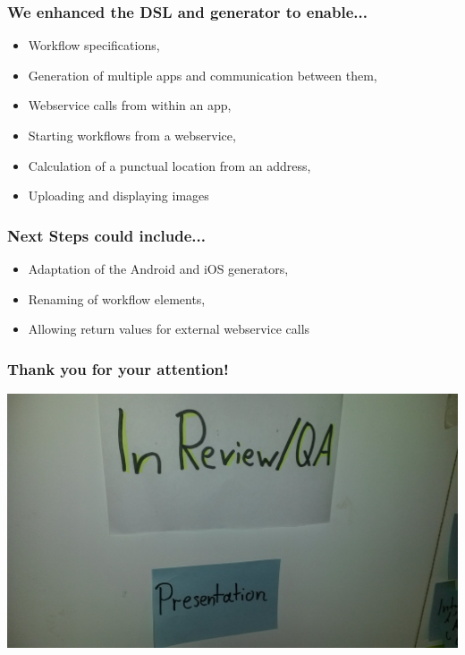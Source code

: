 \begin{frame}[t]
    \frametitle{We enhanced the DSL and generator to enable...}
    
    \begin{itemize}
    	\item Workflow specifications,
    	\item Generation of multiple apps and communication between them,
    	\item Webservice calls from within an app,
    	\item Starting workflows from a webservice,
    	\item Calculation of a punctual location from an address,
    	\item Uploading and displaying images
    \end{itemize}

\end{frame}

\begin{frame}[t]
    \frametitle{Next Steps could include...}

	\begin{itemize}
		\item Adaptation of the Android and iOS generators,
		\item Renaming of workflow elements,
		\item Allowing return values for external webservice calls
	\end{itemize}
\end{frame}

\begin{frame}
\frametitle{Thank you for your attention!}

\includegraphics[width=1\textwidth]{images/lastslide.jpg}
\end{frame}

